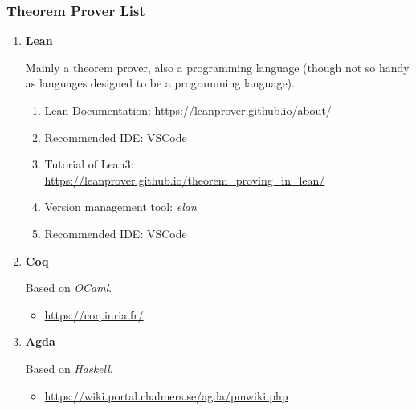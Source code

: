 \documentclass{article}
\begin{document}
\subsubsection{Theorem Prover List}
\begin{enumerate}
\item \textbf{Lean}

Mainly a theorem prover, also a programming language (though not so handy as languages designed to be a programming language).

\begin{enumerate}
    \item Lean Documentation:
    \href{https://leanprover.github.io/about/}{https://leanprover.github.io/about/}
    \item Recommended IDE: VSCode
    \item Tutorial of Lean3:\\
    \href{https://leanprover.github.io/theorem_proving_in_lean/}{https://leanprover.github.io/theorem_proving_in_lean/}
    \item Version management tool: \emph{elan}
    \item Recommended IDE: VSCode
\end{enumerate}

\item \textbf{Coq}

    Based on \emph{OCaml}.
    \begin{itemize}
        \item \href{https://coq.inria.fr/}{https://coq.inria.fr/}
    \end{itemize}

\item \textbf{Agda}

    Based on \emph{Haskell}.
    \begin{itemize}
        \item \href{https://wiki.portal.chalmers.se/agda/pmwiki.php}{https://wiki.portal.chalmers.se/agda/pmwiki.php}
    \end{itemize}
\end{enumerate}
    
\end{document}
